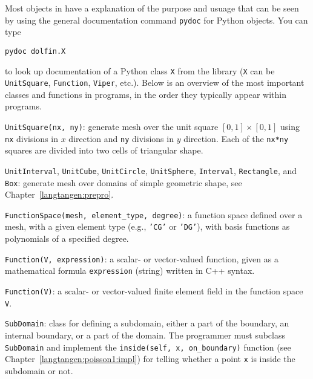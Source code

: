 Most objects in \fenics{} have a explanation of the purpose and usuage
that can be seen by using the general documentation command
{\fontsize{12pt}{12pt}\texttt{pydoc}} for Python objects. You can type
\begin{Verbatim}[fontsize=\fontsize{10pt}{10pt},tabsize=8,baselinestretch=1.05,
fontfamily=tt,xleftmargin=7mm]
pydoc dolfin.X
\end{Verbatim}
\noindent
to look up documentation of a Python class {\fontsize{12pt}{12pt}\texttt{X}} from the \dolfin{}
library ({\fontsize{12pt}{12pt}\texttt{X}} can be {\fontsize{12pt}{12pt}\texttt{UnitSquare}}, {\fontsize{12pt}{12pt}\texttt{Function}},
{\fontsize{12pt}{12pt}\texttt{Viper}}, etc.). Below is an overview of the most important classes
and functions
in \fenics{} programs, in the order they typically appear within programs.\gln

{\fontsize{12pt}{12pt}\texttt{UnitSquare(nx, ny)}}: generate mesh over the unit square
$[0,1]\times [0,1]$ using {\fontsize{12pt}{12pt}\texttt{nx}} divisions in $x$ direction and
{\fontsize{12pt}{12pt}\texttt{ny}} divisions in $y$ direction. Each of the {\fontsize{12pt}{12pt}\texttt{nx*ny}} squares
are divided into two cells of triangular shape.\gln

{\fontsize{12pt}{12pt}\texttt{UnitInterval}}, {\fontsize{12pt}{12pt}\texttt{UnitCube}}, {\fontsize{12pt}{12pt}\texttt{UnitCircle}}, {\fontsize{12pt}{12pt}\texttt{UnitSphere}},
{\fontsize{12pt}{12pt}\texttt{Interval}}, {\fontsize{12pt}{12pt}\texttt{Rectangle}}, and {\fontsize{12pt}{12pt}\texttt{Box}}: generate mesh over
domains of simple geometric shape, see Chapter~\ref{langtangen:prepro}.\gln

{\fontsize{12pt}{12pt}\verb!FunctionSpace(mesh, element_type, degree)!}: 
a function space defined over a mesh, with a given element type
(e.g., {\fontsize{12pt}{12pt}\texttt{'CG'}} or {\fontsize{12pt}{12pt}\texttt{'DG'}}), with basis functions as polynomials of
a specified degree.\gln

{\fontsize{12pt}{12pt}\texttt{Function(V, expression)}}: a scalar- or vector-valued function, given as a
mathematical formula {\fontsize{12pt}{12pt}\texttt{expression}} (string) written in C++ syntax.\gln

{\fontsize{12pt}{12pt}\texttt{Function(V)}}: a scalar- or vector-valued finite element field in
the function space {\fontsize{12pt}{12pt}\texttt{V}}.\gln

{\fontsize{12pt}{12pt}\texttt{SubDomain}}: class for defining a subdomain, either a part of the
boundary, an internal boundary, or a part of the domain.
The programmer must subclass {\fontsize{12pt}{12pt}\texttt{SubDomain}} and implement the
{\fontsize{12pt}{12pt}\verb!inside(self, x, on_boundary)!} function (see Chapter~\ref{langtangen:poisson1:impl}) for telling whether a point {\fontsize{12pt}{12pt}\texttt{x}} is inside the subdomain or not.
\gln

